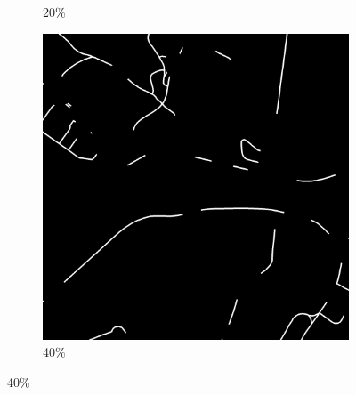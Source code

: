 \begin{figure}[!b]
\begin{subfigure}{0.31\textwidth}
\caption{20\%}
\end{subfigure}
\hspace*{\fill} %
\begin{subfigure}{0.31\textwidth}
\includegraphics[width=\linewidth]{figs/E8/omission/noise4.png}
\caption{40\%}
\end{subfigure}


\end{figure}
